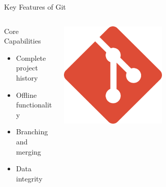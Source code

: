 \documentclass[aspectratio=169]{beamer}
\begin{document}
\begin{frame}{Key Features of Git}
  \begin{columns}
    \begin{column}{0.48\textwidth}
      \begin{block}{Core Capabilities}
        \begin{itemize}
          \item Complete project history
          \item Offline functionality
          \item Branching and merging
          \item Data integrity
        \end{itemize}
      \end{block}
    \end{column}
    \begin{column}{0.48\textwidth}
      \begin{center}
        \includegraphics[width=0.5\textwidth]{figures/gitLogo.png}
      \end{center}
    \end{column}
  \end{columns}
\end{frame}
\end{document}
